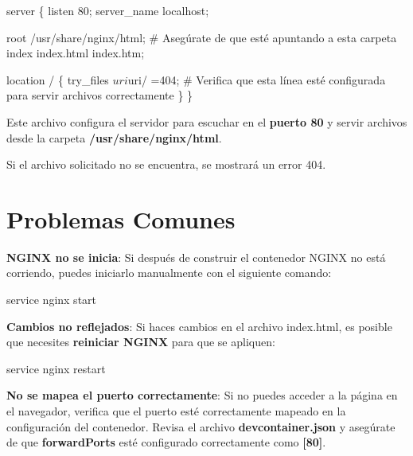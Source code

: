 \documentclass[
  a4paper,
  DIV=11,
  numbers=noendperiod,
  onepage,
  openany]{scrreprt}
\newenvironment{Shaded}{\begin{snugshade}}{\end{snugshade}}
\newcommand{\ExtensionTok}[1]{\textcolor[rgb]{0.00,0.23,0.31}{#1}}
\newcommand{\NormalTok}[1]{\textcolor[rgb]{0.00,0.23,0.31}{#1}}
\begin{document}
\begin{Shaded}
\begin{Highlighting}[]
\NormalTok{server \{}
\NormalTok{    listen 80;}
\NormalTok{    server\_name localhost;}

\NormalTok{    root /usr/share/nginx/html;  \# Asegúrate de que esté apuntando a esta carpeta}
\NormalTok{    index index.html index.htm;}

\NormalTok{    location / \{}
\NormalTok{        try\_files $uri $uri/ =404;  \# Verifica que esta línea esté configurada para servir archivos correctamente}
\NormalTok{    \}}
\NormalTok{\}}
\end{Highlighting}
\end{Shaded}

Este archivo configura el servidor para escuchar en el \textbf{puerto
80} y servir archivos desde la carpeta \textbf{/usr/share/nginx/html}.

Si el archivo solicitado no se encuentra, se mostrará un error 404.

\section{Problemas Comunes}\label{problemas-comunes}

\textbf{NGINX no se inicia}: Si después de construir el contenedor NGINX
no está corriendo, puedes iniciarlo manualmente con el siguiente
comando:

\begin{Shaded}
\begin{Highlighting}[]
\ExtensionTok{service}\NormalTok{ nginx start}
\end{Highlighting}
\end{Shaded}

\textbf{Cambios no reflejados}: Si haces cambios en el archivo
index.html, es posible que necesites \textbf{reiniciar NGINX} para que
se apliquen:

\begin{Shaded}
\begin{Highlighting}[]
\ExtensionTok{service}\NormalTok{ nginx restart}
\end{Highlighting}
\end{Shaded}

\textbf{No se mapea el puerto correctamente}: Si no puedes acceder a la
página en el navegador, verifica que el puerto esté correctamente
mapeado en la configuración del contenedor. Revisa el archivo
\textbf{devcontainer.json} y asegúrate de que \textbf{forwardPorts} esté
configurado correctamente como \textbf{{[}80{]}}.
\end{document}
